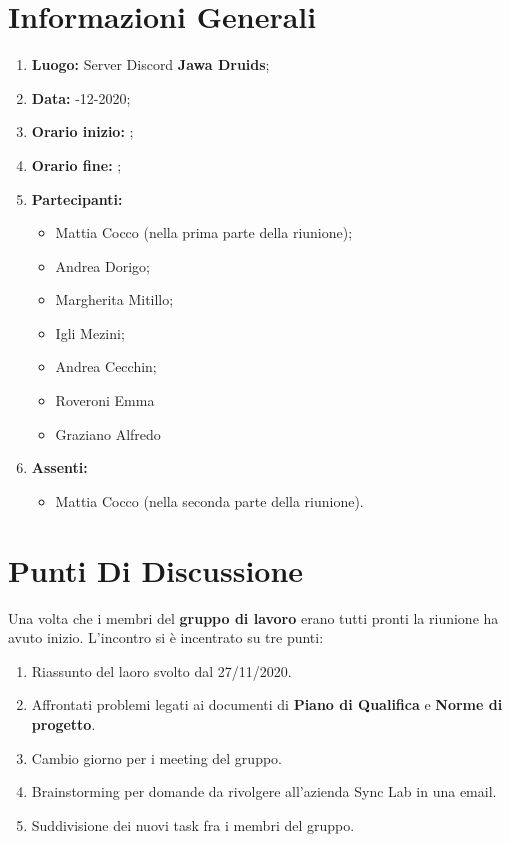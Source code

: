 \newpage
	\chapter{Informazioni Generali}
	\begin{enumerate}
		\item \textbf{Luogo:} \normalfont Server Discord \textbf{Jawa Druids};
		\item \textbf{Data:} -12-2020;
		\item \textbf{Orario inizio:} ;
		\item \textbf{Orario fine:} ;
		\item \textbf{Partecipanti:}
		\begin{itemize}
			\item Mattia Cocco (nella prima parte della riunione); 
			\item Andrea Dorigo;
			\item Margherita Mitillo;
			\item Igli Mezini;
			\item Andrea Cecchin;
			\item Roveroni Emma
			\item Graziano Alfredo
		\end{itemize}
		\item \textbf{Assenti:}
		\begin{itemize}
			\item Mattia Cocco (nella seconda parte della riunione).
		\end{itemize}
	\end{enumerate}
	\newpage
	
	\chapter{Punti Di Discussione}
	Una volta che i membri del \textbf{gruppo di lavoro} erano tutti pronti la riunione ha avuto inizio.
	L'incontro si è incentrato su tre punti:
	\begin{enumerate}
		\item Riassunto del laoro svolto dal 27/11/2020.
		
		\item Affrontati problemi legati ai documenti di \textbf{Piano di Qualifica} e \textbf{Norme di progetto}.
		
		\item Cambio giorno per i meeting del gruppo.
		
		\item Brainstorming per domande da rivolgere all'azienda Sync Lab in una email.
		
		\item Suddivisione dei nuovi task fra i membri del gruppo.
	\end{enumerate}
